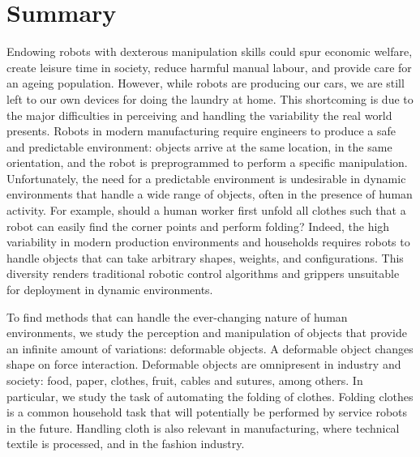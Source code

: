 \documentclass[\home/main.tex]{subfiles}
\begin{document}

\chapter{Summary}

Endowing robots with dexterous manipulation skills could spur economic welfare, create leisure time in society, reduce harmful manual labour, and provide care for an ageing population.
However, while robots are producing our cars, we are still left to our own devices for doing the laundry at home. This shortcoming is due to the major difficulties in perceiving and handling the variability the real world presents.
Robots in modern manufacturing require engineers to produce a safe and predictable environment: objects arrive at the same location, in the same orientation, and the robot is preprogrammed to perform a specific manipulation.
Unfortunately, the need for a predictable environment is undesirable in dynamic environments that handle a wide range of objects, often in the presence of human activity. For example, should a human worker first unfold all clothes such that a robot can easily find the corner points and perform folding?
Indeed, the high variability in modern production environments and households requires robots to handle objects that can take arbitrary shapes, weights, and configurations. This diversity renders traditional robotic control algorithms and grippers unsuitable for deployment in dynamic environments.

To find methods that can handle the ever-changing nature of human environments, we study the perception and manipulation of objects that provide an infinite amount of variations: deformable objects. A deformable object changes shape on force interaction. Deformable objects are omnipresent in industry and society: food, paper, clothes, fruit, cables and sutures, among others. In particular, we study the task of automating the folding of clothes. Folding clothes is a common household task that will potentially be performed by service robots in the future. Handling cloth is also relevant in manufacturing, where technical textile is processed, and in the fashion industry.
\end{document}
